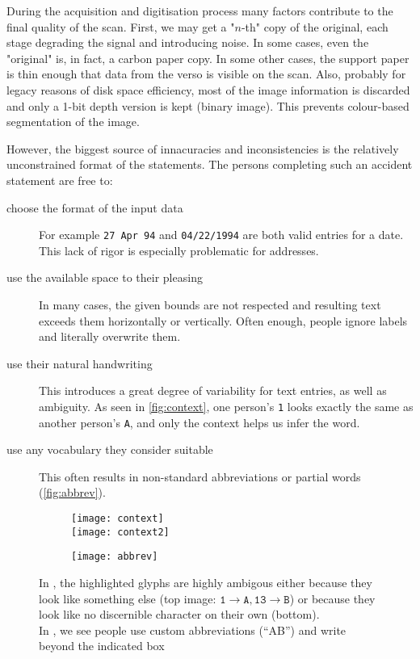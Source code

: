 	During the acquisition and digitisation process many factors contribute to the final quality of the scan. First, we may get a "$n$-th" copy of the original, each stage degrading the signal and introducing noise. In some cases, even the "original" is, in fact, a carbon paper copy. In some other cases, the support paper is thin enough that data from the verso is visible on the scan. Also, probably for legacy reasons of disk space efficiency, most of the image information is discarded and only a 1-bit depth version is kept (binary image). This prevents colour-based segmentation of the image.

	However, the biggest source of innacuracies and inconsistencies is the relatively unconstrained format of the statements. The persons completing such an accident statement are free to:
	\begin{description}
		\item[choose the format of the input data] For example \texttt{27 Apr 94} and \texttt{04/22/1994} are both valid entries for a date. This lack of rigor is especially problematic for addresses.

		\item[use the available space to their pleasing] In many cases, the given bounds are not respected and resulting text exceeds them horizontally or vertically. Often enough, people ignore labels and literally overwrite them.

		\item[use their natural handwriting] \label{itm:natural_handwriting} This introduces a great degree of variability for text entries, as well as ambiguity. As seen in \autoref{fig:context}, one person's \texttt{1} looks exactly the same as another person's \texttt{A}, and only the context helps us infer the word.

		\item[use any vocabulary they consider suitable] This often results in non-standard abbreviations or partial words (\autoref{fig:abbrev}).
	\end{description}

	\begin{figure}
		\begin{subfigure}[b]{.5\linewidth}
			\centering
			\texttt{[image: context]}\\
			\texttt{[image: context2]}
			\caption{}\label{fig:context}
		\end{subfigure}
		\begin{subfigure}[b]{.48\linewidth}
			\texttt{[image: abbrev]}
			\caption{}\label{fig:abbrev}
		\end{subfigure}
		\caption[Ambiguity in handwriting]{In , the highlighted glyphs are highly ambigous either because they look like something else (top image: \(\mathtt{1} \rightarrow \mathtt{A}, \mathtt{13} \rightarrow \mathtt{B} \)) or because they look like no discernible character on their own (bottom).\\
		In , we see people use custom abbreviations (``AB'') and write beyond the indicated box}
	\end{figure}


